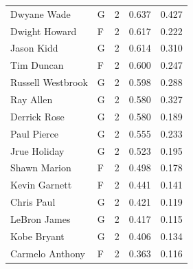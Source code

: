 \begin{table}[t]
\begin{tabular*}{\linewidth}{@{\extracolsep{\fill}}llcrr}
Dwyane Wade & G & 2 & 0.637 & 0.427 \\ 
Dwight Howard & F & 2 & 0.617 & 0.222 \\ 
Jason Kidd & G & 2 & 0.614 & 0.310 \\ 
Tim Duncan & F & 2 & 0.600 & 0.247 \\ 
Russell Westbrook & G & 2 & 0.598 & 0.288 \\ 
Ray Allen & G & 2 & 0.580 & 0.327 \\ 
Derrick Rose & G & 2 & 0.580 & 0.189 \\ 
Paul Pierce & G & 2 & 0.555 & 0.233 \\ 
Jrue Holiday & G & 2 & 0.523 & 0.195 \\ 
Shawn Marion & F & 2 & 0.498 & 0.178 \\ 
Kevin Garnett & F & 2 & 0.441 & 0.141 \\ 
Chris Paul & G & 2 & 0.421 & 0.119 \\ 
LeBron James & G & 2 & 0.417 & 0.115 \\ 
Kobe Bryant & G & 2 & 0.406 & 0.134 \\ 
Carmelo Anthony & F & 2 & 0.363 & 0.116 \\ 
\bottomrule
\end{tabular*}
\end{table}

